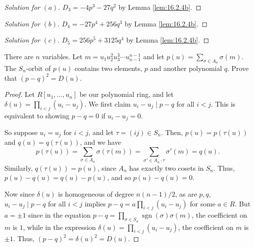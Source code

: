 \documentclass[12pt]{article}
\theoremstyle{remark}
\begin{document}
\begin{proof}[Solution for $(a)$]
  $D_3 = -4p^3 - 27q^2$ by Lemma \ref{lem:16.2.4b}.
\end{proof}
\begin{proof}[Solution for $(b)$]
  $D_4 = -27p^4 + 256q^3$ by Lemma \ref{lem:16.2.4b}.
\end{proof}
\begin{proof}[Solution for $(c)$]
  $D_5 = 256p^5 + 3125q^4$ by Lemma \ref{lem:16.2.4b}.
\end{proof}

\setcounter{subsubsection}{6}
\begin{problem}
  There are $n$ variables. Let $m = u_1u_2^2 u_3^3 \cdots u_{n-1}^{n-1}$ and let $p(u) = \displaystyle\sum_{\sigma \in A_n}\sigma(m)$.  The $S_n$-orbit of $p(u)$ contains two elements, $p$ and another polynomial $q$.  Prove that $(p-q)^2 = D(u)$.
\end{problem}
\begin{proof}
  Let $R[u_1,\ldots,u_n]$ be our polynomial ring, and let $\delta(u) = \prod_{i < j}(u_i - u_j)$. We first claim $u_i - u_j \mid p - q$ for all $i < j$. This is equivalent to showing $p-q = 0$ if $u_i - u_j = 0$.
  \par So suppose $u_i = u_j$ for $i < j$, and let $\tau = (ij) \in S_n$. Then, $p(u) = p(\tau(u))$ and $q(u) = q(\tau(u))$, and we have
  \begin{equation*}
    p(\tau(u)) = \sum_{\sigma \in A_n} \sigma(\tau(m)) = \sum_{\sigma' \in A_n\cdot\tau} \sigma'(m) = q(u).
  \end{equation*}
  Similarly, $q(\tau(u)) = p(u)$, since $A_n$ has exactly two cosets in $S_n$. Thus, $p(u) - q(u) = q(u) - p(u)$, and so $p(u) - q(u) = 0$.
  \par Now since $\delta(u)$ is homogeneous of degree $n(n-1)/2$, as are $p,q$, $u_i - u_j \mid p - q$ for all $i<j$ implies $p-q=a\prod_{i < j}(u_i-u_j)$ for some $a \in R$. But $a = \pm1$ since in the equation $p - q = \prod_{\sigma \in S_n} \operatorname{sgn}(\sigma)\sigma(m)$, the coefficient on $m$ is $1$, while in the expression $\delta(u) = \prod_{i < j} (u_i - u_j)$, the coefficient on $m$ is $\pm1$. Thus, $(p-q)^2 = \delta(u)^2 = D(u)$.
\end{proof}
\end{document}
